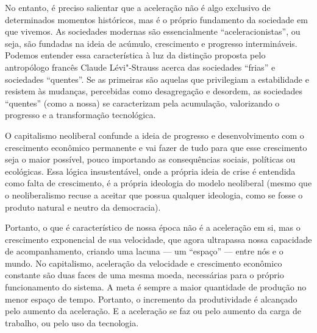 No entanto, é preciso salientar que a aceleração não é algo exclusivo de
determinados momentos históricos, mas é o próprio fundamento da
sociedade em que vivemos. As sociedades modernas são essencialmente
``aceleracionistas'', ou seja, são fundadas na ideia de acúmulo,
crescimento e progresso intermináveis. Podemos entender essa
característica à luz da distinção proposta pelo antropólogo francês
Claude Lévi"-Strauss acerca das sociedades ``frias'' e sociedades
``quentes''. Se as primeiras são aquelas que privilegiam a estabilidade
e resistem às mudanças, percebidas como desagregação e desordem, as
sociedades ``quentes'' (como a nossa) se caracterizam pela acumulação,
valorizando o progresso e a transformação tecnológica.

O capitalismo neoliberal confunde a ideia de progresso e desenvolvimento
com o crescimento econômico permanente e vai fazer de tudo para que esse
crescimento seja o maior possível, pouco importando as consequências
sociais, políticas ou ecológicas. Essa lógica insustentável, onde a
própria ideia de crise é entendida como falta de crescimento, é a
própria ideologia do modelo neoliberal (mesmo que o neoliberalismo
recuse a aceitar que possua qualquer ideologia, como se fosse o produto
natural e neutro da democracia).

Portanto, o que é característico de nossa época não é a aceleração em
si, mas o crescimento exponencial de sua velocidade, que agora
ultrapassa nossa capacidade de acompanhamento, criando uma lacuna --- um
``espaço'' --- entre nós e o mundo. No capitalismo, aceleração da
velocidade e crescimento econômico constante são duas faces de uma mesma
moeda, necessárias para o próprio funcionamento do sistema. A meta é
sempre a maior quantidade de produção no menor espaço de tempo.
Portanto, o incremento da produtividade é alcançado pelo aumento da
aceleração. E a aceleração se faz ou pelo aumento da carga de trabalho,
ou pelo uso da tecnologia.

